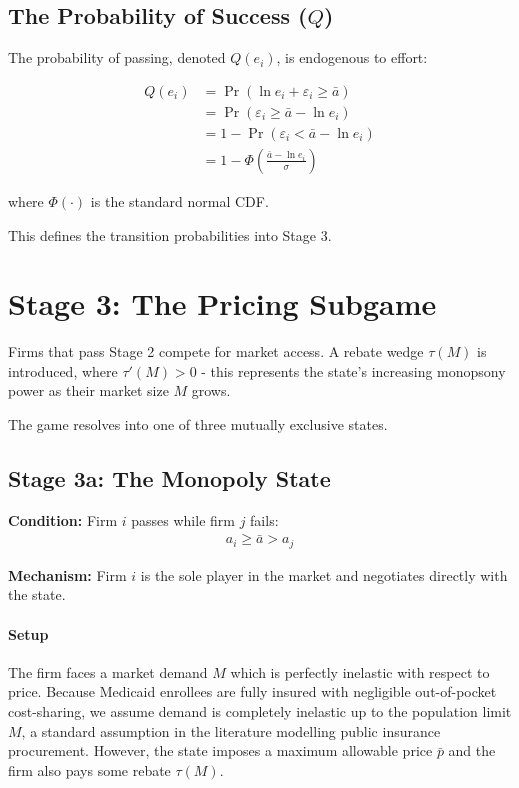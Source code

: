 \documentclass[12pt]{article}
\begin{document}
\subsection{The Probability of Success \texorpdfstring{($Q$)}{(Q)}}
The probability of passing, denoted $Q(e_i)$, is endogenous to effort:

\begin{align}
    Q(e_i) &= \Pr(\ln e_i + \varepsilon_i \geq \bar{a}) \\
           &= \Pr(\varepsilon_i \geq \bar{a} - \ln e_i) \\
           &= 1 - \Pr(\varepsilon_i < \bar{a} - \ln e_i) \\
           &= 1 - \Phi\left(\frac{\bar{a} - \ln e_i}{\sigma}\right)
\end{align}

where $\Phi(\cdot)$ is the standard normal CDF. \vspace{1em}

This defines the transition probabilities into Stage 3.

\newpage

\section{Stage 3: The Pricing Subgame}
Firms that pass Stage 2 compete for market access. A rebate wedge $\tau(M)$ is introduced, where $\tau'(M) > 0$ - this represents the state's increasing monopsony power as their market size $M$ grows.

The game resolves into one of three mutually exclusive states.

\subsection{Stage 3a: The Monopoly State}

\textbf{Condition:} Firm $i$ passes while firm $j$ fails:
\begin{align*}
    a_i \geq \bar{a} > a_j
\end{align*}

\textbf{Mechanism:} Firm $i$ is the sole player in the market and negotiates directly with the state.

\paragraph{Setup} 
The firm faces a market demand $M$ which is perfectly inelastic with respect to price. Because Medicaid enrollees are fully insured with negligible out-of-pocket cost-sharing, we assume demand is completely inelastic up to the population limit $M$, a standard assumption in the literature modelling public insurance procurement. However, the state imposes a maximum allowable price $\bar{p}$ and the firm also pays some rebate $\tau(M)$.
\end{document}
